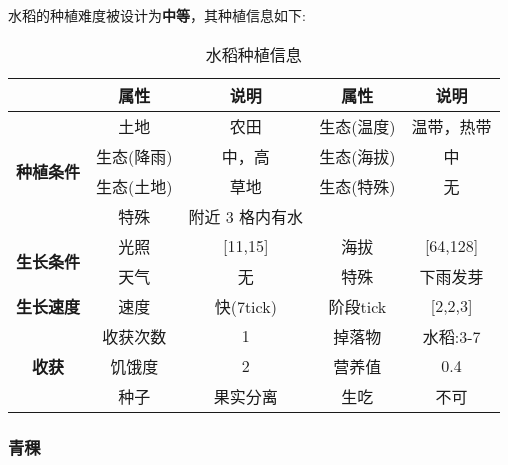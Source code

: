 水稻的种植难度被设计为\textbf{中等}，其种植信息如下:

\begin{table}[H]
    \centering
    \caption{水稻种植信息}
    \label{table:水稻种植信息}
    \setlength{\tabcolsep}{4mm}
    \begin{tabular}{c|cc|cc}
        \toprule
                                           & \textbf{属性} & \textbf{说明}   & \textbf{属性} & \textbf{说明} \\
        \midrule
        \multirow{4}{*}{\textbf{种植条件}} & 土地          & 农田            & 生态(温度)    & 温带，热带    \\
                                           & 生态(降雨)    & 中，高          & 生态(海拔)    & 中            \\
                                           & 生态(土地)    & 草地            & 生态(特殊)    & 无            \\
                                           & 特殊          & 附近 3 格内有水                                 \\
        \midrule
        \multirow{2}{*}{\textbf{生长条件}} & 光照          & [11,15]         & 海拔          & [64,128]      \\
                                           & 天气          & 无              & 特殊          & 下雨发芽      \\
        \midrule
        \textbf{生长速度}                  & 速度          & 快(7tick)       & 阶段tick      & [2,2,3]       \\
        \midrule
        \multirow{3}{*}{\textbf{收获}}     & 收获次数      & 1               & 掉落物        & 水稻:3-7      \\
                                           & 饥饿度        & 2               & 营养值        & 0.4           \\
                                           & 种子          & 果实分离        & 生吃          & 不可          \\
        \bottomrule
    \end{tabular}
\end{table}

\subsubsection{青稞}

